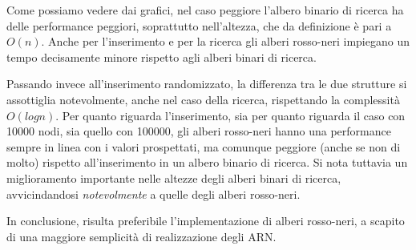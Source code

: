 \documentclass[
]{article}
\begin{document}
Come possiamo vedere dai grafici, nel caso peggiore l'albero binario di
ricerca ha delle performance peggiori, soprattutto nell'altezza, che da
definizione è pari a \({O}(n)\). Anche per l'inserimento e per la
ricerca gli alberi rosso-neri impiegano un tempo decisamente minore
rispetto agli alberi binari di ricerca.

Passando invece all'inserimento randomizzato, la differenza tra le due
strutture si assottiglia notevolmente, anche nel caso della ricerca,
rispettando la complessità \({O}(logn)\). Per quanto riguarda
l'inserimento, sia per quanto riguarda il caso con 10000 nodi, sia
quello con 100000, gli alberi rosso-neri hanno una performance sempre in
linea con i valori prospettati, ma comunque peggiore (anche se non di
molto) rispetto all'inserimento in un albero binario di ricerca. Si nota
tuttavia un miglioramento importante nelle altezze degli alberi binari
di ricerca, avvicindandosi \emph{notevolmente} a quelle degli alberi
rosso-neri.

In conclusione, risulta preferibile l'implementazione di alberi
rosso-neri, a scapito di una maggiore semplicità di realizzazione degli
ARN.
\end{document}
